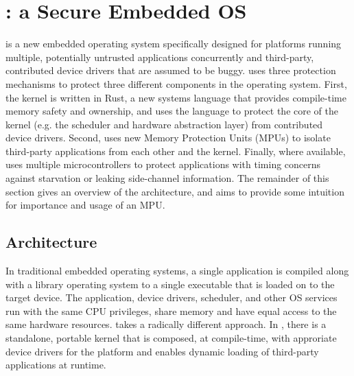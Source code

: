 \section{\name: a Secure Embedded OS}

\name is a new embedded operating system
specifically designed for platforms running multiple, potentially untrusted
applications concurrently and third-party, contributed device drivers that are
assumed to be buggy. \name uses three protection mechanisms to protect three
different components in the operating system.
First, the kernel is written in Rust, a new systems language that provides
compile-time memory safety and ownership, and uses the language to protect the
core of the kernel (e.g. the scheduler and hardware abstraction layer) from
contributed device drivers.
Second, \name uses new Memory Protection Units (MPUs) to isolate third-party
applications from each other and the kernel.
Finally, where available, \name uses multiple microcontrollers to protect
applications with timing concerns against starvation or leaking side-channel
information.
The remainder of this section gives an overview of the \name architecture,
and aims to provide some intuition for importance and usage of an MPU.

\subsection{Architecture}

In traditional embedded operating systems, a single application is
compiled along with a library operating system to a single executable that is
loaded on to the target device. The application, device drivers, scheduler, and
other OS services run with the same CPU privileges, share memory and have equal access
to the same hardware resources. \name takes a radically different approach. In
\name, there is a standalone, portable kernel that is composed, at compile-time,
with approriate device drivers for the platform and enables dynamic loading of
third-party applications at runtime.

